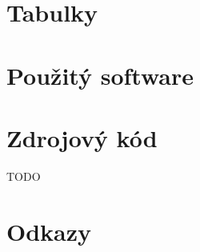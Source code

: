 \documentclass{ctuthesis}
\begin{document}
\chapter{Tabulky}



\chapter{Použitý software}



\chapter{Zdrojový kód}

TODO

\chapter{Odkazy}


\end{document}
